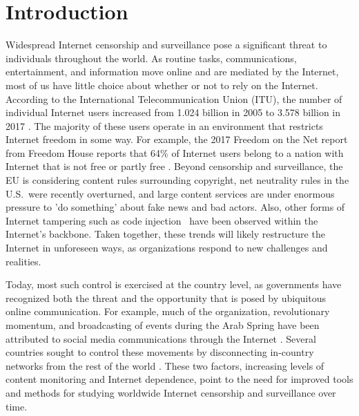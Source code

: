 \section{Introduction}

\par Widespread Internet censorship and surveillance pose a
significant threat to individuals throughout the world. As routine
tasks, communications, entertainment, and information move online and
are mediated by the Internet, most of us have little choice about
whether or not to rely on the Internet.  According to the
International Telecommunication Union (ITU), the number of individual
Internet users increased from 1.024 billion in 2005 to 3.578 billion
in 2017 \cite{itu}. The majority of these users operate in an
environment that restricts Internet freedom in some way. For example,
the 2017 Freedom on the Net report from Freedom House reports that
64\% of Internet users belong to a nation with Internet that is not
free or partly free \cite{FOTN}.  Beyond censorship and surveillance,
the EU is considering content rules surrounding copyright, net
neutrality rules in the U.S.\ were recently overturned, and large
content services are under enormous pressure to 'do
something' about fake news and bad actors. Also, other forms of Internet
tampering such as code injection~\cite{badtraffic,191996} have been observed within the
Internet's backbone. Taken together, these
trends will likely restructure the Internet in unforeseen ways,
as organizations respond to new challenges and realities.

Today, most such control is exercised at the country level,
as governments have recognized both the threat and the opportunity
that is posed by ubiquitous online communication. For example, much
of the organization, revolutionary momentum, and broadcasting of
events during the Arab Spring have been attributed to social media
communications through the Internet \cite{arabspring}. Several countries
sought to control these movements by disconnecting in-country networks from the rest of the world \cite{BGPdisrupt}.
These two factors, increasing levels of content monitoring and
Internet dependence, point to the need for improved tools and methods
for studying worldwide Internet censorship and surveillance over time.

